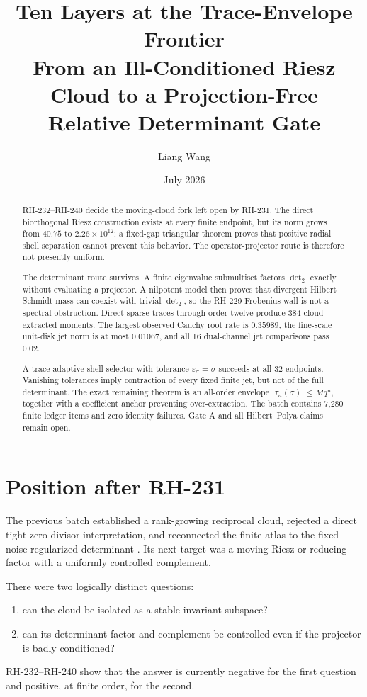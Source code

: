 \documentclass[11pt]{article}
\title{Ten Layers at the Trace-Envelope Frontier\\
\large From an Ill-Conditioned Riesz Cloud to a Projection-Free Relative Determinant Gate}
\author{Liang Wang}
\date{July 2026}
\theoremstyle{remark}
\begin{document}
\maketitle

\begin{abstract}
RH-232--RH-240 decide the moving-cloud fork left open by RH-231.  The direct
biorthogonal Riesz construction exists at every finite endpoint, but its norm
grows from $40.75$ to $2.26\times10^{12}$; a fixed-gap triangular theorem
proves that positive radial shell separation cannot prevent this behavior.
The operator-projector route is therefore not presently uniform.

The determinant route survives.  A finite eigenvalue submultiset factors
$\det_2$ exactly without evaluating a projector.  A nilpotent model then
proves that divergent Hilbert--Schmidt mass can coexist with trivial
$\det_2$, so the RH-229 Frobenius wall is not a spectral obstruction.  Direct
sparse traces through order twelve produce 384 cloud-extracted moments.  The
largest observed Cauchy root rate is $0.35989$, the fine-scale unit-disk jet
norm is at most $0.01067$, and all 16 dual-channel jet comparisons pass
$0.02$.

A trace-adaptive shell selector with tolerance $\varepsilon_\sigma=\sigma$
succeeds at all 32 endpoints.  Vanishing tolerances imply contraction of
every fixed finite jet, but not of the full determinant.  The exact remaining
theorem is an all-order envelope
$|\tau_n(\sigma)|\le Mq^n$, together with a coefficient anchor preventing
over-extraction.  The batch contains 7,280 finite ledger items and zero
identity failures.  Gate A and all Hilbert--Polya claims remain open.
\end{abstract}

\section{Position after RH-231}

The previous batch established a rank-growing reciprocal cloud, rejected a
direct tight-zero-divisor interpretation, and reconnected the finite atlas to
the fixed-noise regularized determinant \citep{WangRH222,WangRH228,WangRH229,
WangRH230,WangRH231}.  Its next target was a moving Riesz or reducing factor
with a uniformly controlled complement.

There were two logically distinct questions:
\begin{enumerate}[leftmargin=2em]
\item can the cloud be isolated as a stable invariant subspace?
\item can its determinant factor and complement be controlled even if the
projector is badly conditioned?
\end{enumerate}
RH-232--RH-240 show that the answer is currently negative for the first
question and positive, at finite order, for the second.
\end{document}
